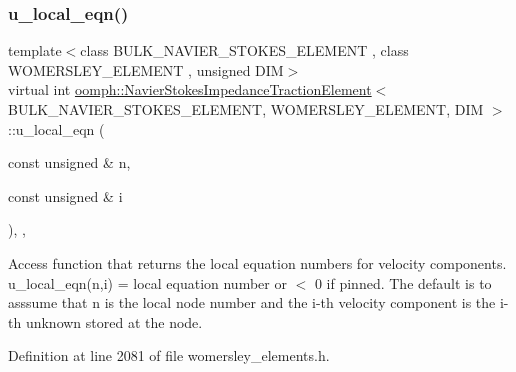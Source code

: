 \subsubsection{\texorpdfstring{u\+\_\+local\+\_\+eqn()}{u\_local\_eqn()}}
{\footnotesize\ttfamily template$<$class B\+U\+L\+K\+\_\+\+N\+A\+V\+I\+E\+R\+\_\+\+S\+T\+O\+K\+E\+S\+\_\+\+E\+L\+E\+M\+E\+NT , class W\+O\+M\+E\+R\+S\+L\+E\+Y\+\_\+\+E\+L\+E\+M\+E\+NT , unsigned D\+IM$>$ \\
virtual int \hyperlink{classoomph_1_1NavierStokesImpedanceTractionElement}{oomph\+::\+Navier\+Stokes\+Impedance\+Traction\+Element}$<$ B\+U\+L\+K\+\_\+\+N\+A\+V\+I\+E\+R\+\_\+\+S\+T\+O\+K\+E\+S\+\_\+\+E\+L\+E\+M\+E\+NT, W\+O\+M\+E\+R\+S\+L\+E\+Y\+\_\+\+E\+L\+E\+M\+E\+NT, D\+IM $>$\+::u\+\_\+local\+\_\+eqn (\begin{DoxyParamCaption}\item[{const unsigned \&}]{n,  }\item[{const unsigned \&}]{i }\end{DoxyParamCaption})\hspace{0.3cm}{\ttfamily [inline]}, {\ttfamily [protected]}, {\ttfamily [virtual]}}



Access function that returns the local equation numbers for velocity components. u\+\_\+local\+\_\+eqn(n,i) = local equation number or $<$ 0 if pinned. The default is to asssume that n is the local node number and the i-\/th velocity component is the i-\/th unknown stored at the node. 



Definition at line 2081 of file womersley\+\_\+elements.\+h.

\mbox{\label{classoomph_1_1NavierStokesImpedanceTractionElement_a3be6b5b3152e35c76339a5de6ec1e93a}} 
